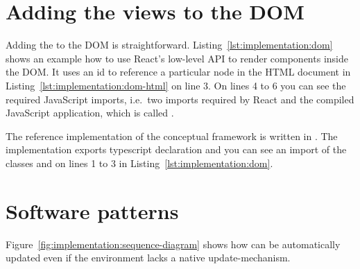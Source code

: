 

\section{Adding the views to the DOM}

Adding the \gv{} to the DOM is straightforward.
Listing~\ref{lst:implementation:dom} shows an example how to use React's low-level API to render components inside the DOM.
It uses an id  to reference a particular node in the HTML document in Listing~\ref{lst:implementation:dom-html} on line 3.
On lines 4 to 6 you can see the required JavaScript imports, i.e.\ two imports required by React and the compiled JavaScript application, which is called .





The reference implementation of the conceptual framework is written in \footnotemark.
The implementation exports typescript declaration and you can see an import of the classes  and  on lines 1 to 3 in Listing~\ref{lst:implementation:dom}.


\section{Software patterns}\label{sec:implementation:patterns}
Figure~\ref{fig:implementation:sequence-diagram} shows how \cmvs{} can be automatically updated even if the environment lacks a native update-mechanism.

